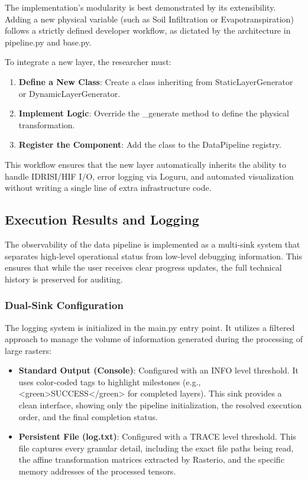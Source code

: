 The implementation's modularity is best demonstrated by its extensibility. Adding a new physical variable (such as Soil 
Infiltration or Evapotranspiration) follows a strictly defined developer workflow, as dictated by the architecture in 
pipeline.py and base.py.

To integrate a new layer, the researcher must:

\begin{enumerate}
    \item \textbf{Define a New Class}: Create a class inheriting from StaticLayerGenerator or DynamicLayerGenerator.
    \item \textbf{Implement Logic}: Override the \_generate method to define the physical transformation.
    \item \textbf{Register the Component}: Add the class to the DataPipeline registry.
\end{enumerate}

This workflow ensures that the new layer automatically inherits the ability to handle IDRISI/HIF I/O, error logging 
via Loguru, and automated visualization without writing a single line of extra infrastructure code.


\subsection{Execution Results and Logging}

The observability of the data pipeline is implemented as a multi-sink system that separates high-level operational 
status from low-level debugging information. This ensures that while the user receives clear progress updates, the 
full technical history is preserved for auditing.


\subsubsection{Dual-Sink Configuration}

The logging system is initialized in the main.py entry point. It utilizes a filtered approach to manage the volume 
of information generated during the processing of large rasters:

\begin{itemize}
    \item \textbf{Standard Output (Console)}: Configured with an INFO level threshold. It uses color-coded tags to 
    highlight milestones (e.g., <green>SUCCESS</green> for completed layers). This sink provides a clean interface, 
    showing only the pipeline initialization, the resolved execution order, and the final completion status.
    \item \textbf{Persistent File (log.txt)}: Configured with a TRACE level threshold. This file captures every 
    granular detail, including the exact file paths being read, the affine transformation matrices extracted by 
    Rasterio, and the specific memory addresses of the processed tensors.
\end{itemize}


